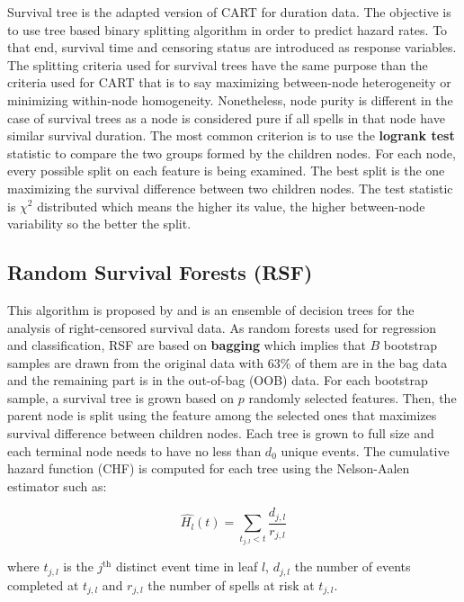 \documentclass[
]{book}
\begin{document}
Survival tree \citep{SURV_TREE} is the adapted version of CART for duration data. The objective is to use tree based binary splitting algorithm in order to predict hazard rates. To that end, survival time and censoring status are introduced as response variables. The splitting criteria used for survival trees have the same purpose than the criteria used for CART that is to say maximizing between-node heterogeneity or minimizing within-node homogeneity. Nonetheless, node purity is different in the case of survival trees as a node is considered pure if all spells in that node have similar survival duration. The most common criterion is to use the \textbf{logrank test} statistic to compare the two groups formed by the children nodes. For each node, every possible split on each feature is being examined. The best split is the one maximizing the survival difference
between two children nodes. The test statistic is \(\chi^2\) distributed which means the higher its value, the higher between-node variability so the better the split.

\hypertarget{random-survival-forests-rsf}{%
\subsection{Random Survival Forests (RSF)}\label{random-survival-forests-rsf}}

This algorithm is proposed by \citet{RSF} and is an ensemble of decision trees for the analysis of right-censored survival data. As random forests used for regression and classification, RSF are based on \textbf{bagging} which implies that \(B\) bootstrap samples are drawn from the original data with 63\(\%\) of them are in the bag data and the remaining part is in the out-of-bag (OOB) data. For each bootstrap sample, a survival tree is grown based on \(p\) randomly selected features. Then, the parent node is split using the feature among the selected ones that maximizes survival difference between children nodes. Each tree is grown to full size and each terminal node needs to have no less than \(d_0\) unique events. The cumulative hazard function (CHF) is computed for each tree using the Nelson-Aalen estimator such as:

\begin{equation}
  \widehat{H_l}(t) = \sum_{t_{j, l} < t} \frac{d_{j,l}}{r_{j,l}}
  \label{eq:chf}
\end{equation}

where \(t_{j,l}\) is the \(j^{\text{th}}\) distinct event time in leaf \(l\), \(d_{j,l}\) the number of events completed at \(t_{j,l}\) and \(r_{j,l}\) the number of spells at risk at \(t_{j,l}\).
\end{document}
